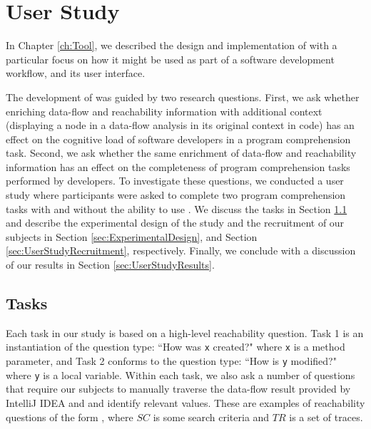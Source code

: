 
\newcommand{\cardamount}{40}

\chapter{User Study}
\label{ch:UserStudy}

In Chapter \ref{ch:Tool}, we described the design and implementation of
\toolname{} with a particular focus on how it might be used as part of a
software development workflow, and its user interface.
\par The development of \toolname{} was guided by two research questions.
First, we ask whether enriching data-flow and reachability information with 
additional context (\eg displaying a node in a data-flow analysis in its 
original context in code) has an effect on the cognitive load of software 
developers in a program comprehension task.
Second, we ask whether the same enrichment of data-flow and reachability
information has an effect on the completeness of program comprehension tasks
performed by developers.
To investigate these questions, we conducted a user study where participants 
were asked to complete two program comprehension tasks with and without the 
ability to use \toolname{}.
We discuss the tasks in Section \ref{sec:Tasks} and describe the experimental
design of the study and the recruitment of our subjects in Section
\ref{sec:ExperimentalDesign}, and Section \ref{sec:UserStudyRecruitment}, 
respectively.
Finally, we conclude with a discussion of our results in Section
\ref{sec:UserStudyResults}.

\section{Tasks}
\label{sec:Tasks}

Each task in our study is based on a high-level reachability question. 
Task 1 is an instantiation of the question type: ``How was \texttt{x} created?"
where \texttt{x} is a method parameter, and Task 2 conforms to the question
type: ``How is \texttt{y} modified?" where \texttt{y} is a local variable.
Within each task, we also ask a number of questions that require our subjects
to manually traverse the data-flow result provided by IntelliJ IDEA and
\toolname{} and identify relevant values.
These are examples of reachability questions of the form \findq{}, where
$SC$ is some search criteria and $TR$ is a set of traces.

